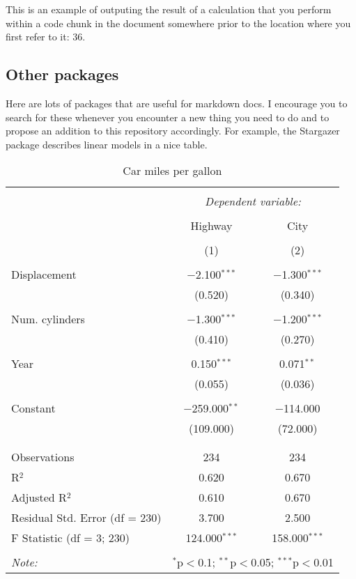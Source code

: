 \documentclass[]{elsarticle} %
\theoremstyle{definition}
\theoremstyle{definition}
\theoremstyle{definition}
\theoremstyle{remark}
\begin{document}
This is an example of outputing the result of a calculation that you
perform within a code chunk in the document somewhere prior to the
location where you first refer to it: 36.

\hypertarget{other-packages}{%
\subsection{Other packages}\label{other-packages}}

Here are lots of packages that are useful for markdown docs. I encourage
you to search for these whenever you encounter a new thing you need to
do and to propose an addition to this repository accordingly. For
example, the Stargazer package describes linear models in a nice table.

\begin{table}[!htbp] \centering 
  \caption{Car miles per gallon} 
  \label{} 
\begin{tabular}{@{\extracolsep{1pt}}lcc} 
\\[-1.8ex]\hline 
\hline \\[-1.8ex] 
 & \multicolumn{2}{c}{\textit{Dependent variable:}} \\ 
\cline{2-3} 
\\[-1.8ex] & Highway & City \\ 
\\[-1.8ex] & (1) & (2)\\ 
\hline \\[-1.8ex] 
 Displacement & $-$2.100$^{***}$ & $-$1.300$^{***}$ \\ 
  & (0.520) & (0.340) \\ 
  & & \\ 
 Num. cylinders & $-$1.300$^{***}$ & $-$1.200$^{***}$ \\ 
  & (0.410) & (0.270) \\ 
  & & \\ 
 Year & 0.150$^{***}$ & 0.071$^{**}$ \\ 
  & (0.055) & (0.036) \\ 
  & & \\ 
 Constant & $-$259.000$^{**}$ & $-$114.000 \\ 
  & (109.000) & (72.000) \\ 
  & & \\ 
\hline \\[-1.8ex] 
Observations & 234 & 234 \\ 
R$^{2}$ & 0.620 & 0.670 \\ 
Adjusted R$^{2}$ & 0.610 & 0.670 \\ 
Residual Std. Error (df = 230) & 3.700 & 2.500 \\ 
F Statistic (df = 3; 230) & 124.000$^{***}$ & 158.000$^{***}$ \\ 
\hline 
\hline \\[-1.8ex] 
\textit{Note:}  & \multicolumn{2}{r}{$^{*}$p$<$0.1; $^{**}$p$<$0.05; $^{***}$p$<$0.01} \\ 
\end{tabular} 
\end{table}
\end{document}

